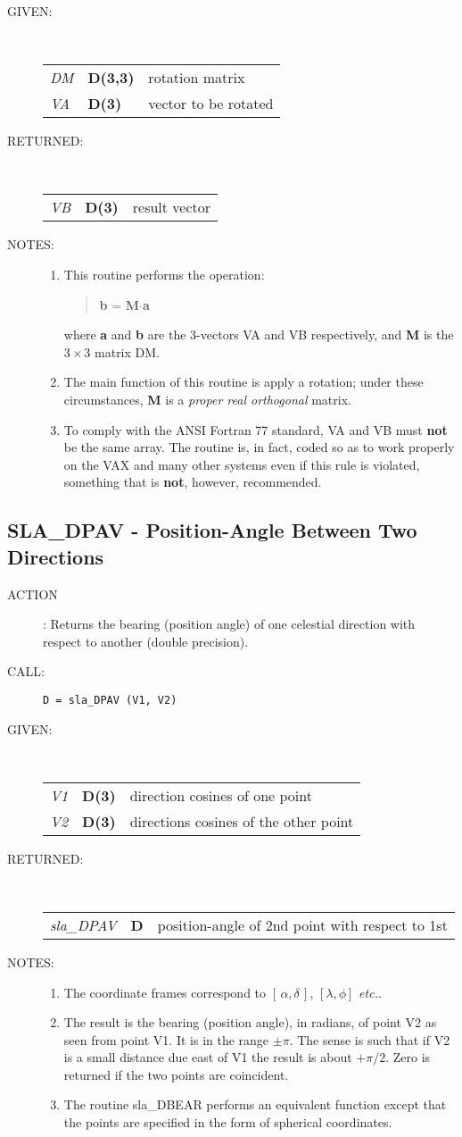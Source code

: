 \documentclass[11pt,twoside]{article}
\newcommand{\xlabel}[1]{}
\newcommand{\radec}     {$[\,\alpha,\delta\,]$}
\newcommand{\routine}[3]
{\hbadness=10000
  \vbox
  {
    \rule{\textwidth}{0.3mm}\\
    {\Large {\bf #1} \hfill #2 \hfill {\bf #1}}\\
    \setlength{\oldspacing}{\topsep}
    \setlength{\topsep}{0.3ex}
    \begin{description}
      #3
    \end{description}
    \setlength{\topsep}{\oldspacing}
  }
}
\renewcommand{\routine}[3]
   {
      \subsection{#1\xlabel{#1} - #2\label{#1}}
       \begin{description}
         #3
       \end{description}
   }
\newcommand{\action}[1]
{\item[ACTION]: #1}
\newcommand{\action}[1]
   {\item[ACTION:] #1}
\newcommand{\call}[1]
{\item[CALL]: \hspace{0.4em}{\tt #1}}
\newlength{\oldspacing}
\renewcommand{\call}[1]
   {
    \item[CALL:] {\tt #1}
   }
\newcommand{\args}[2]
{
  \goodbreak
  \setlength{\oldspacing}{\topsep}
  \setlength{\topsep}{0.3ex}
  \begin{description}
  \item[#1]:\\[1.5ex]
    \begin{tabular}{p{7em}p{6em}p{22em}}
      #2
    \end{tabular}
  \end{description}
  \setlength{\topsep}{\oldspacing}
}
\renewcommand{\args}[2]
   {
     \begin{description}
        \item[#1:]\\
        \begin{tabular}{p{7em}p{6em}l}
           #2
        \end{tabular}
     \end{description}
   }
\newcommand{\spec}[3]
{
  {\em {#1}} & {\bf \mbox{#2}} & {#3}
}
\newcommand{\notes}[1]
{
  \goodbreak
  \setlength{\oldspacing}{\topsep}
  \setlength{\topsep}{0.3ex}
  \begin{description}
    \item[NOTES]:
        #1
  \end{description}
  \setlength{\topsep}{\oldspacing}
}
\renewcommand{\notes}[1]
   {
      \begin{description}
         \item[NOTES:]
            #1
      \end{description}
   }
\begin{document}
\args{GIVEN}
{
 \spec{DM}{D(3,3)}{rotation matrix} \\
 \spec{VA}{D(3)}{vector to be rotated}
}
\args{RETURNED}
{
 \spec{VB}{D(3)}{result vector}
}
\notes
{
 \begin{enumerate}
  \item This routine performs the operation:
        \begin{verse}
           {\bf b} = {\bf M}$\cdot${\bf a}
        \end{verse}
        where {\bf a} and {\bf b} are the 3-vectors VA and VB
        respectively, and {\bf M} is the $3\times3$ matrix DM.
  \item The main function of this routine is apply a
        rotation;  under these circumstances, {\bf M} is a
        {\it proper real orthogonal}\/ matrix.
  \item To comply with the ANSI Fortran 77 standard, VA and VB must
        {\bf not} be the same array.  The routine is, in fact, coded
        so as to work properly on the VAX and many other systems even
        if this rule is violated, something that is {\bf not}, however,
        recommended.
 \end{enumerate}
}
\routine{SLA\_DPAV}{Position-Angle Between Two Directions}
{
 \action{Returns the bearing (position angle) of one celestial
         direction with respect to another (double precision).}
 \call{D~=~sla\_DPAV (V1, V2)}
}
\args{GIVEN}
{
 \spec{V1}{D(3)}{direction cosines of one point} \\
 \spec{V2}{D(3)}{directions cosines of the other point}
}
\args{RETURNED}
{
 \spec{sla\_DPAV}{D}{position-angle of 2nd point with respect to 1st}
}
\notes
{
 \begin{enumerate}
 \item The coordinate frames correspond to \radec,
       $[\lambda,\phi]$ {\it etc.}.
 \item The result is the bearing (position angle), in radians,
       of point V2 as seen
       from point V1.  It is in the range $\pm \pi$.  The sense
       is such that if V2
       is a small distance due east of V1 the result
       is about $+\pi/2$. Zero is returned
       if the two points are coincident.
 \item The routine sla\_DBEAR performs an equivalent function except
       that the points are specified in the form of spherical coordinates.
 \end{enumerate}
}
\end{document}
